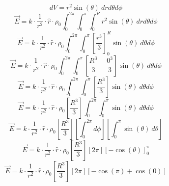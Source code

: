 \documentclass[twoside]{article}
\begin{document}
\begin{itemize}
          \begin{equation*}
              dV = r^2 \sin(\theta) \ dr  d\theta d\phi
          \end{equation*}
          \begin{equation*}
              \vec{E} = \displaystyle k \cdot \frac{1}{r^2} \cdot \hat{r} \cdot \rho_0 \int_{0}^{2\pi} \int_{0}^{\pi} \int_{0}^{R} r^2 \sin(\theta)\ dr d\theta d\phi
          \end{equation*}
          \begin{equation*}
              \vec{E} = \displaystyle k \cdot \frac{1}{r^2} \cdot \hat{r} \cdot \rho_0 \int_{0}^{2\pi} \int_{0}^{\pi} \left[ \frac{r^3}{3} \right]_0^R \sin(\theta)\ d\theta d\phi
          \end{equation*}
          \begin{equation*}
              \vec{E} = \displaystyle k \cdot \frac{1}{r^2} \cdot \hat{r} \cdot \rho_0 \int_{0}^{2\pi} \int_{0}^{\pi} \left[ \frac{R^3}{3} - \frac{0^3}{3} \right] \sin(\theta)\ d\theta d\phi
          \end{equation*}
          \begin{equation*}
              \vec{E} = \displaystyle k \cdot \frac{1}{r^2} \cdot \hat{r} \cdot \rho_0 \int_{0}^{2\pi} \int_{0}^{\pi} \left[ \frac{R^3}{3} \right] \sin(\theta)\ d\theta d\phi
          \end{equation*}
          \begin{equation*}
              \vec{E} = \displaystyle k \cdot \frac{1}{r^2} \cdot \hat{r} \cdot \rho_0 \left[ \frac{R^3}{3} \right] \int_{0}^{2\pi} \int_{0}^{\pi} \sin(\theta)\ d\theta d\phi
          \end{equation*}
          \begin{equation*}
              \vec{E} = \displaystyle k \cdot \frac{1}{r^2} \cdot \hat{r} \cdot \rho_0 \left[ \frac{R^3}{3} \right] \left[ \int_{0}^{2\pi} d\phi \right] \left[ \int_{0}^{\pi} \sin(\theta)\ d\theta \right]
          \end{equation*}
          \begin{equation*}
              \vec{E} = \displaystyle k \cdot \frac{1}{r^2} \cdot \hat{r} \cdot \rho_0 \left[ \frac{R^3}{3} \right] \left[ 2\pi \right] \left[ -\cos(\theta) \right]_0^{\pi}
          \end{equation*}
          \begin{equation*}
              \vec{E} = \displaystyle k \cdot \frac{1}{r^2} \cdot \hat{r} \cdot \rho_0 \left[ \frac{R^3}{3} \right] \left[ 2\pi \right] \left[ -\cos(\pi) + \cos(0) \right]

\end{equation*}
\end{itemize}
\end{document}
